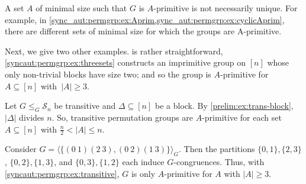A set $A$ of minimal size such that $G$ is $A$-primitive is not necessarily unique.
For example, in \cref{sync_aut:permgrp:ex:Aprim,sync_aut:permgrp:ex:cyclicAprim},
there are different sets of minimal size for which the groups are A-primitive.

Next, we give two other examples.  is 
rather straightforward, \cref{syncaut:permgrp:ex:threesets} constructs an imprimitive group on $[n]$
whose only non-trivial blocks have size two; and so the group is $A$-primitive
for $A \subseteq [n]$ with~$|A| \ge 3$.

\begin{example}
	\label{syncaut:permgrp:ex:transitive}
	Let $G \le_G \mathcal S_n$ be transitive
	and $\Delta \subseteq [n]$ be a block.
	By \cref{prelim:ex:trans-block}, $|\Delta|$
	divides $n$.
	So, transitive permutation groups are $A$-primitive
	for each set $A \subseteq [n]$ with $\frac{n}{2} < |A| \le n$.
\end{example}

\begin{example}
	Consider $G = \langle \{ (0 ~ 1)(2 ~ 3), (0 ~ 2)(1 ~ 3)\} \rangle_G$.
	Then the partitions $\{0,1\}, \{2,3\}$,
	$\{0,2\},\{1,3\}$, and $\{0,3\}, \{1,2\}$
	each induce $G$-congruences.
	Thus, with \cref{syncaut:permgrp:ex:transitive},
	$G$ is only $A$-primitive for $A$
	with $|A| \ge 3$.
\end{example}

